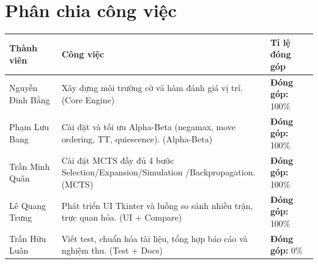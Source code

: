 \section*{Phân chia công việc}
\begin{longtable}{|p{4cm}|p{6cm}|p{4cm}|}
\hline
\textbf{Thành viên} & \textbf{Công việc} & \textbf{Tỉ lệ đóng góp} \\
\hline
Nguyễn Đinh Bằng 
& Xây dựng môi trường cờ và hàm đánh giá vị trí. (Core Engine)
& \textbf{Đóng góp:} 100\% \\
\hline
Phạm Lưu Bang
& Cài đặt và tối ưu Alpha-Beta (negamax, move ordering, TT, quiescence). (Alpha-Beta)
& \textbf{Đóng góp:} 100\% \\
\hline
Trần Minh Quân 
& Cài đặt MCTS đầy đủ 4 bước Selection/Expansion/Simulation /Backpropagation. (MCTS)
& \textbf{Đóng góp:} 100\% \\
\hline
Lê Quang Trưng
& Phát triển UI Tkinter và luồng so sánh nhiều trận, trực quan hóa. (UI + Compare)
& \textbf{Đóng góp:} 100\% \\
\hline
Trần Hữu Luân
& Viết test, chuẩn hóa tài liệu, tổng hợp báo cáo và nghiệm thu. (Test + Docs)
& \textbf{Đóng góp:} 0\% \\
\hline
\end{longtable}
\normalsize



